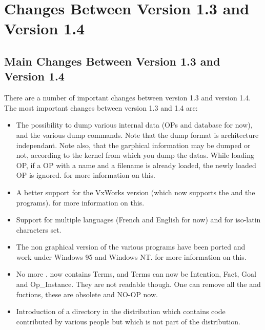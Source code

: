 \section{Changes Between Version 1.3 and Version 1.4}



\subsection{Main Changes Between Version 1.3 and Version 1.4}

There are a number of important changes between version 1.3 and version 1.4.
The most important changes between version 1.3 and 1.4 are:

\begin{itemize}

\item The possibility to dump various internal data (OPs and database for now),
and the various dump commands. Note that the dump format is architecture
independant. Note also, that the garphical information may be dumped or not,
according to the kernel from which you dump the datas. While loading OP, if a
OP with a name and a filename is already loaded, the newly loaded OP is
ignored.  for more information on
this. 

\item A better support for the VxWorks version (which now supports the \MP{}
and the  programs).  for more information on
this. 

\item Support for multiple languages (French and English for now) and for
iso-latin characters set.

\item The non graphical version of the various \COPRSDE{} programs have been
ported and work under Windows 95 and Windows NT.  for more
information on this.

\item No more .  now contains Terms, and Terms
can now be Intention, Fact, Goal and Op\_Instance. They are not readable
though. One can remove all the  and 
fuctions, these are obsolete and NO-OP now.

\item Introduction of a  directory in the distribution which
contains code contributed by various people but which is not part of the \OPRS{}
distribution. 

\end{itemize}


